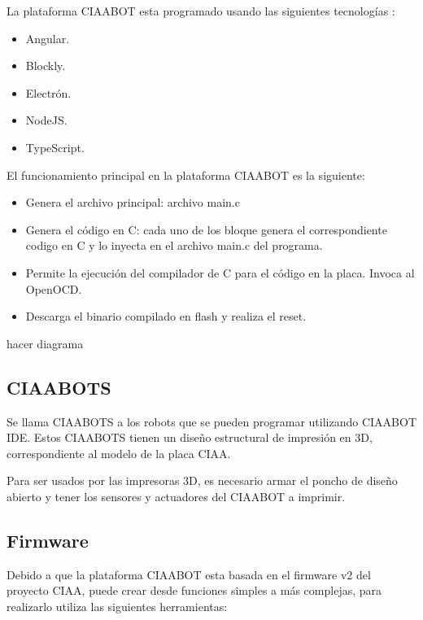 La plataforma CIAABOT esta programado usando las siguientes tecnologías \citep{angular}\citep{blockly}\citep{electron}\citep{nodejs}\citep{typescript}:

\begin{itemize}
	\item Angular.
	\item Blockly.
	\item Electrón.
	\item NodeJS.
	\item TypeScript.
\end{itemize}

El funcionamiento principal en la plataforma CIAABOT es la siguiente:

\begin{itemize}
	\item Genera el archivo principal: archivo main.c
	\item Genera el código en C: cada uno de los bloque genera el correspondiente codigo en C y lo inyecta en el archivo main.c del programa.
	\item Permite la ejecución del compilador de C para el código en la placa.
	Invoca al OpenOCD.
	\item Descarga el binario compilado en flash y realiza el reset.
\end{itemize}


hacer diagrama


\subsection{CIAABOTS}
\label{subsec:CIAABOTS}

Se llama CIAABOTS a los robots que se pueden programar utilizando CIAABOT IDE. Estos CIAABOTS tienen un diseño estructural de impresión en 3D, correspondiente al modelo de la placa CIAA. 

Para ser usados por las impresoras 3D, es necesario armar el poncho de diseño abierto y tener los sensores y actuadores del CIAABOT a imprimir.

\subsection{Firmware}
\label{subsec:Firmware}

Debido a que la plataforma CIAABOT esta basada en el firmware v2 \citep{CIAA:firmwarev2} del proyecto CIAA, puede crear desde funciones simples a más complejas, para realizarlo
utiliza las siguientes herramientas:


